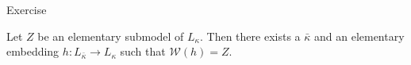 Exercise

Let $Z$ be an elementary submodel of $L_\kappa$. Then there exists a $\bar{\kappa}$ and an elementary embedding $h: L_{\bar{\kappa}} \rightarrow L_\kappa$ such that $\mathcal{W}(h) = Z$.
